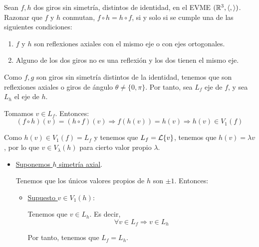 \begin{ejercicio}
    Sean $f, h$ dos giros sin simetría, distintos de identidad, en el EVME $(\mathbb{R}^3, \langle,\rangle)$. Razonar que $f$ y $h$ conmutan, $f\circ h = h\circ f$, si y solo si se cumple una de las siguientes condiciones:
    \begin{enumerate}
        \item $f$ y $h$ son reflexiones axiales con el mismo eje o con ejes ortogonales.

        \item Alguno de los dos giros no es una reflexión y los dos tienen el mismo eje.
    \end{enumerate}


    Como $f,g$ son giros sin simetría distintos de la identidad, tenemos que son reflexiones axiales o giros de ángulo $\theta \neq \{0,\pi\}$. Por tanto, sea $L_f$ eje de $f$, y sea $L_h$ el eje de $h$.

    Tomamos $v\in L_f$. Entonces:
    \begin{equation*}
        (f\circ h)(v)= (h\circ f)(v) \Longrightarrow f(h(v)) = h(v) \Longrightarrow h(v)\in V_1(f)
    \end{equation*}

    Como $h(v)\in V_1(f)=L_f$ y tenemos que $L_f=\mathcal{L}\{v\}$, tenemos que $h(v)=\lambda v$, por lo que $v\in V_{\lambda}(h)$ para cierto valor propio $\lambda$.

    \begin{itemize}
        \item \underline{Suponemos $h$ simetría axial}.

        Tenemos que los únicos valores propios de $h$ son $\pm 1$. Entonces:
        \begin{itemize}
            \item \underline{Supuesto $v\in V_1(h)$}:

            Tenemos que $v\in L_h$. Es decir,
            \begin{equation*}
                \forall v\in L_f \Longrightarrow v\in L_h
            \end{equation*}
    
            Por tanto, tenemos que $L_f = L_h$.

            \begin{comment}
            Además, dado $v\in L_f^\perp$ tenemos que:
            \begin{equation*}
                (f\circ h)(v) = (h\circ f)(v) \Longleftrightarrow
                f(h(v))=h(f(v)) \Longrightarrow f(v)\in V_{-1}(h)=L_h^\perp
            \end{equation*}


\end{comment}
\end{itemize}
\end{itemize}
\end{ejercicio}
